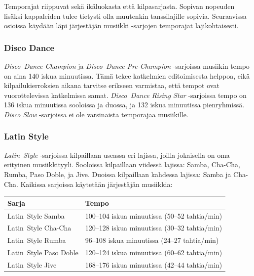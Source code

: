 \documentclass[12pt, a4paper, oneside]{article}
\begin{document}
Temporajat riippuvat sekä ikäluokasta että kilpasarjasta.
Sopivan nopeuden lisäksi kappaleiden tulee tietysti olla muutenkin tanssilajille sopivia.
Seuraavissa osioissa käydään läpi järjestäjän musiikki -sarjojen temporajat lajikohtaisesti.

\subsubsection{Disco Dance}

\textit{Disco~Dance Champion} ja \textit{Disco~Dance Pre-Champion} -sarjoissa musiikin tempo on aina 140 iskua minuutissa.
Tämä tekee katkelmien editoimisesta helppoa,
eikä kilpailukierroksien aikana tarvitse erikseen varmistaa,
että tempot ovat vuorottelevissa katkelmissa samat.
\textit{Disco~Dance Rising Star} -sarjoissa tempo on 136 iskua minuutissa sooloissa ja duossa,
ja 132 iskua minuutissa pienryhmissä.
\textit{Disco Slow} -sarjoissa ei ole varsinaista temporajaa musiikille.

\subsubsection{Latin Style}

\textit{Latin~Style} -sarjoissa kilpaillaan useassa eri lajissa,
joilla jokaisella on oma erityinen musiikkityyli.
Sooloissa kilpaillaan viidessä lajissa: Samba, Cha-Cha, Rumba, Paso Doble, ja Jive.
Duoissa kilpaillaan kahdessa lajissa: Samba ja Cha-Cha.
Kaikissa sarjoissa käytetään järjestäjän musiikkia: \medskip

\begin{table}[ht]
    \centering
    \setlength\tabcolsep{8mm}
    \renewcommand{\arraystretch}{1.5}
    \begin{tabular}{@{\hspace{0.25cm}}ll@{\hspace{0.25cm}}}
        \toprule
        Sarja                  & Tempo                                         \\ \midrule
        Latin~Style Samba      & 100--104 iskua minuutissa (50--52 tahtia/min) \\
        Latin~Style Cha-Cha    & 120--128 iskua minuutissa (30--32 tahtia/min) \\
        Latin~Style Rumba      &  96--108 iskua minuutissa (24--27 tahtia/min) \\
        Latin~Style Paso Doble & 120--124 iskua minuutissa (60--62 tahtia/min) \\
        Latin~Style Jive       & 168--176 iskua minuutissa (42--44 tahtia/min) \\ \bottomrule
    \end{tabular}
    \label{tab:latin-bpm}
\end{table}
\end{document}
